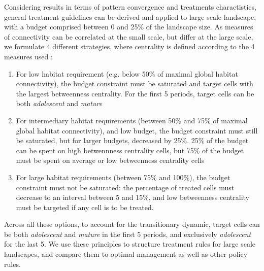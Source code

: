 Considering results in terms of pattern convergence and treatments charactistics, general treatment guidelines can be derived and applied to large scale landscape, with a budget comprised between 0 and 25\% of the landscape size. As measures of connectivity can be correlated at the small scale, but differ at the large scale, we formulate 4 different strategies, where centrality is defined according to the 4 measures used : 
\begin{enumerate}
\item For low habitat requirement (e.g. below 50\% of maximal global habitat connectivity), the budget constraint must be saturated and target cells with the largest betweenness centrality. For the first 5 periods, target cells can be both \textit{adolescent} and \textit{mature}

\item For intermediary habitat requirements (between 50\% and 75\% of maximal global habitat connectivity), and low budget, the budget constraint must still be saturated, but for larger budgets, decreased by 25\%. 25\% of the budget can be spent on high betwennness centrality cells, but 75\% of the budget must be spent on average or low betweenness centrality cells

\item For large habitat requirements (between 75\% and 100\%), the budget constraint must not be saturated:  the percentage of treated cells must decrease to an interval between 5 and 15\%, and low betweenness centrality must be targeted if any cell is to be treated. 
\end{enumerate}
Across all these options, to account for the transitionary dynamic, target cells can be both \textit{adolescent} and \textit{mature} in the first 5 periods, and exclusively \textit{adolescent} for the last 5. We use these principles to structure treatment rules for large scale landscapes, and compare them to optimal management as well as other policy rules. 


